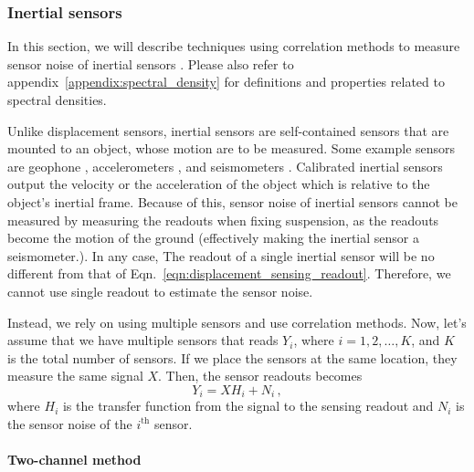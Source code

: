 \subsubsection{Inertial sensors \label{sec:inertial_sensors_baseline}}
In this section, we will describe techniques using correlation methods to measure sensor noise of inertial sensors \cite{technique_for_measurement_of_the_noise, Sleeman2006ThreeChannelCA}. Please also refer to appendix~\ref{appendix:spectral_density} for definitions and properties related to spectral densities.

Unlike displacement sensors, inertial sensors are self-contained sensors that are mounted to an object, whose motion are to be measured.
Some example sensors are geophone \cite{Sekiguchi:2016bmv}, accelerometers \cite{status_of_acc_development_2}, and seismometers \cite{trillium_compact_120-sv1}.
Calibrated inertial sensors output the velocity or the acceleration of the object which is relative to the object's inertial frame.
Because of this, sensor noise of inertial sensors cannot be measured by measuring the readouts when fixing suspension, as the readouts become the motion of the ground (effectively making the inertial sensor a seismometer.).
In any case, The readout of a single inertial sensor will be no different from that of Eqn.~\eqref{eqn:displacement_sensing_readout}.
Therefore, we cannot use single readout to estimate the sensor noise.

Instead, we rely on using multiple sensors and use correlation methods.
Now, let's assume that we have multiple sensors that reads $Y_i$, where $i=1,2,\dots,K$, and $K$ is the total number of sensors.
If we place the sensors at the same location, they measure the same signal $X$.
Then, the sensor readouts becomes
\begin{equation}
	Y_i = XH_i + N_i\,,
	\label{eqn:inertial_sensing_readout}
\end{equation}
where $H_i$ is the transfer function from the signal to the sensing readout and $N_i$ is the sensor noise of the $i^\mathrm{th}$ sensor.

\paragraph{Two-channel method}

